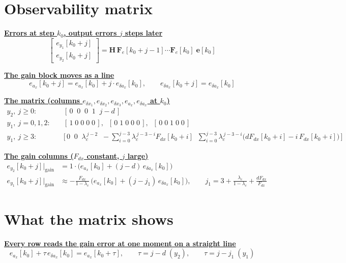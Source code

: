 \documentclass[11pt,a4paper]{ctexart}
\newcommand{\lc}{\lambda_c}
\newcommand{\hd}[1]{\par\bigskip\noindent\underline{\textbf{#1}}}
\begin{document}
\section{Observability matrix}

\hd{Errors at step $k_0$, output errors $j$ steps later}
\[
\begin{bmatrix} e_{y_1}[k_0+j] \\ e_{y_2}[k_0+j] \end{bmatrix}
= \mathbf{H}\,\mathbf{F}_e[k_0+j-1]\cdots\mathbf{F}_e[k_0]\;\mathbf{e}[k_0]
\]

\hd{The gain block moves as a line}
\[
e_{a_x}[k_0+j] = e_{a_x}[k_0] + j\cdot e_{\delta a_x}[k_0], \qquad e_{\delta a_x}[k_0+j] = e_{\delta a_x}[k_0]
\]

\hd{The matrix (columns $e_{\delta x_1}, e_{\delta x_2}, e_{\delta x_3}, e_{a_x}, e_{\delta a_x}$ at $k_0$)}
\[
\begin{aligned}
y_2,\ j \ge 0:&\quad [\,0 \;\; 0 \;\; 0 \;\; 1 \;\; j-d\,] \\
y_1,\ j = 0, 1, 2:&\quad [\,1\;0\;0\;0\;0\,],\;\; [\,0\;1\;0\;0\;0\,],\;\; [\,0\;0\;1\;0\;0\,] \\
y_1,\ j \ge 3:&\quad \Big[\,0 \;\; 0 \;\; \lc^{\,j-2} \;\; -\textstyle\sum_{i=0}^{j-3}\lc^{\,j-3-i}F_{dx}[k_0+i] \;\;
\textstyle\sum_{i=0}^{j-3}\lc^{\,j-3-i}\big(dF_{dx}[k_0+i] - i\,F_{dx}[k_0+i]\big)\,\Big]
\end{aligned}
\]

\hd{The gain columns ($F_{dx}$ constant, $j$ large)}
\[
\begin{aligned}
e_{y_2}[k_0+j]\Big|_{\text{gain}} &= 1\cdot\big(e_{a_x}[k_0] + (j - d)\,e_{\delta a_x}[k_0]\big) \\
e_{y_1}[k_0+j]\Big|_{\text{gain}} &\approx -\frac{F_{dx}}{1-\lc}\,\big(e_{a_x}[k_0] + (j - j_1)\,e_{\delta a_x}[k_0]\big), \qquad
j_1 = 3 + \frac{\lc}{1-\lc} + \frac{dF_{dx}}{F_{dx}}
\end{aligned}
\]

\section{What the matrix shows}

\hd{Every row reads the gain error at one moment on a straight line}
\[
e_{a_x}[k_0] + \tau\,e_{\delta a_x}[k_0] = e_{a_x}[k_0+\tau], \qquad
\tau = j - d \;(y_2), \qquad \tau = j - j_1 \;(y_1)
\]
\end{document}
